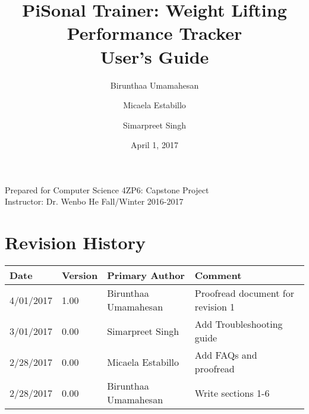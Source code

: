 \documentclass{article}
\title{
PiSonal Trainer: Weight Lifting Performance Tracker\\
\Large {User's Guide}
}
\date{April 1, 2017}
\author{Birunthaa Umamahesan \and Micaela Estabillo \and Simarpreet Singh}
\begin{document}
\thispagestyle{plain}
\maketitle
\vfill
\begin{center}
    Prepared for Computer Science 4ZP6: Capstone Project \\
    Instructor: Dr. Wenbo He
    Fall/Winter 2016-2017\\
\end{center}
\newpage

\tableofcontents

\listoffigures

\listoftables

\thispagestyle{plain}

\newpage

\section*{Revision History}
\begingroup
\begin{tabular}{ | p{2cm} | p{1.5cm} | p{3.8cm} | p{7cm} |} 
    \hline
    \textbf{Date} & \textbf{Version} & \textbf{Primary Author} & \textbf{Comment}\\
    \hline
    4/01/2017 & 1.00 & Birunthaa Umamahesan & Proofread document for revision 1 \\
    \hline
    3/01/2017 & 0.00 & Simarpreet Singh & Add Troubleshooting guide \\
    \hline
    2/28/2017 & 0.00 & Micaela Estabillo & Add FAQs and proofread\\
    \hline
    2/28/2017 & 0.00 & Birunthaa Umamahesan & Write sections 1-6\\
    \hline
\end{tabular}
\endgroup


\begin{center}
\end{center}

\newpage

\clearpage
\setcounter{page}{1}

% 
\end{document}
